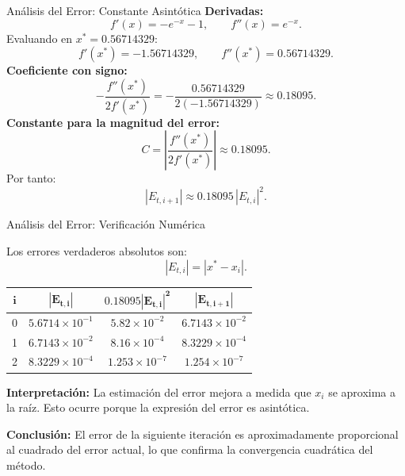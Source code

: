 \documentclass[../../main.tex]{subfiles}
\begin{document}
\begin{frame}{Análisis del Error: Constante Asintótica}
\textbf{Derivadas:}
\[
f'(x)=-e^{-x}-1,
\qquad
f''(x)=e^{-x}.
\]
Evaluando en \(x^*=0.56714329\):
\[
f'(x^*)=-1.56714329,
\qquad
f''(x^*)=0.56714329.
\]
\textbf{Coeficiente con signo:}
\[
-\frac{f''(x^*)}{2f'(x^*)}
=
-\frac{0.56714329}{2(-1.56714329)}
\approx0.18095.
\]
\textbf{Constante para la magnitud del error:}
\[
C=
\left|
\frac{f''(x^*)}{2f'(x^*)}
\right|
\approx0.18095.
\]
Por tanto:
\[
|E_{t,i+1}|
\approx
0.18095\,|E_{t,i}|^2.
\]

\end{frame}



\begin{frame}{Análisis del Error: Verificación Numérica}

\small

Los errores verdaderos absolutos son:
\[
|E_{t,i}|=|x^*-x_i|.
\]

\centering

\begin{tabular}{|c|c|c|c|}
\hline
\(\boldsymbol{i}\) &
\(\boldsymbol{|E_{t,i}|}\) &
\(\boldsymbol{0.18095|E_{t,i}|^2}\) &
\(\boldsymbol{|E_{t,i+1}|}\) \\ \hline
0 &
\(5.6714\times10^{-1}\) &
\(5.82\times10^{-2}\) &
\(6.7143\times10^{-2}\) \\

1 &
\(6.7143\times10^{-2}\) &
\(8.16\times10^{-4}\) &
\(8.3229\times10^{-4}\) \\

2 &
\(8.3229\times10^{-4}\) &
\(1.253\times10^{-7}\) &
\(1.254\times10^{-7}\) \\ \hline
\end{tabular}

\vspace{0.7em}

\raggedright
\textbf{Interpretación:}
La estimación del error mejora a medida que \(x_i\) se aproxima
a la raíz. Esto ocurre porque la expresión del error es asintótica.

\vspace{0.5em}

\textbf{Conclusión:}
El error de la siguiente iteración es aproximadamente proporcional
al cuadrado del error actual, lo que confirma la convergencia
cuadrática del método.

\end{frame}
\end{document}
